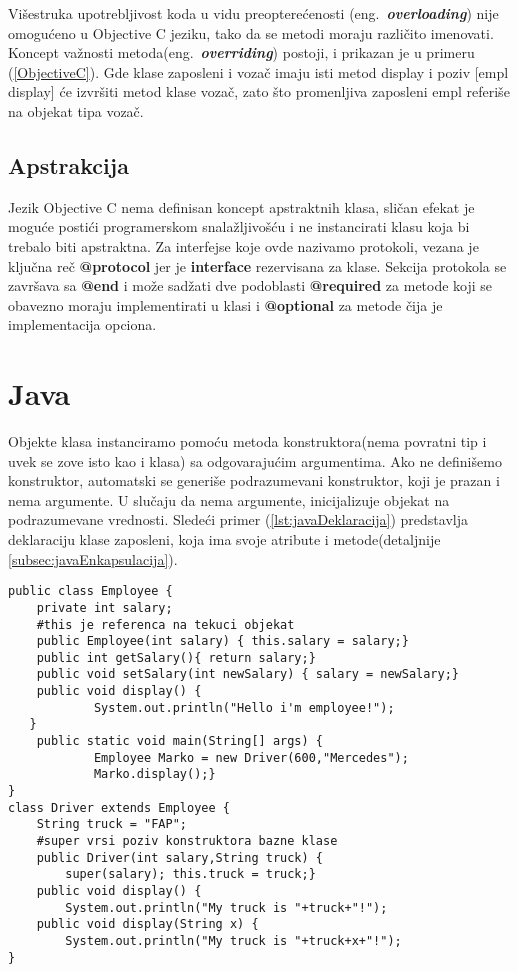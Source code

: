 \documentclass[a4paper]{article}
\begin{document}
Višestruka upotrebljivost koda u vidu preopterećenosti (eng.~\textbf{\em overloading}) nije omogućeno u Objective C jeziku, tako da se metodi moraju različito imenovati\cite{ObjectiveCbook}. Koncept važnosti metoda(eng.~\textbf{\em overriding})  postoji, i prikazan je u primeru (\ref{ObjectiveC}). Gde klase zaposleni i vozač imaju isti metod display i poziv [empl display] će izvršiti metod klase vozač, zato što promenljiva zaposleni empl referiše na objekat tipa vozač.

\subsection{Apstrakcija}
\label{subsec:ObjCApstrakcija}

Jezik Objective C nema definisan koncept apstraktnih klasa\cite{ObjectiveCbook}, sličan efekat je moguće postići programerskom snalažljivošću i ne instancirati klasu koja bi trebalo biti apstraktna. Za interfejse koje ovde nazivamo protokoli, vezana je ključna reč \textbf{@protocol} jer je \textbf{interface} rezervisana za klase. Sekcija protokola se završava sa \textbf{@end} i može sadžati dve podoblasti \textbf{@required} za metode koji se obavezno moraju implementirati u klasi i \textbf{@optional} za metode čija je implementacija opciona.

\section{Java}
\label{sec:java}

Objekte klasa instanciramo pomoću metoda konstruktora(nema povratni tip i uvek se zove isto kao i klasa) sa odgovarajućim argumentima. Ako ne definišemo konstruktor, automatski se generiše podrazumevani konstruktor, koji je prazan i nema argumente. U slučaju da nema argumente, inicijalizuje objekat na podrazumevane vrednosti. Sledeći primer (\ref{lst:javaDeklaracija}) predstavlja deklaraciju klase zaposleni, koja ima svoje atribute i metode(detaljnije \ref{subsec:javaEnkapsulacija}).

\begin{lstlisting}[caption={Primer deklarisanja klase sa enkapsulacijom i nasleđivanjem},frame=single, label=lst:javaDeklaracija]
public class Employee {
	private int salary;
	#this je referenca na tekuci objekat
	public Employee(int salary) { this.salary = salary;}
 	public int getSalary(){ return salary;}
	public void setSalary(int newSalary) { salary = newSalary;}
	public void display() {
     		System.out.println("Hello i'm employee!");
   }
	public static void main(String[] args) {
    		Employee Marko = new Driver(600,"Mercedes");
    		Marko.display();}    
}
class Driver extends Employee {
  	String truck = "FAP";
	#super vrsi poziv konstruktora bazne klase
   	public Driver(int salary,String truck) {
		super(salary); this.truck = truck;}
  	public void display() {
		System.out.println("My truck is "+truck+"!");
	public void display(String x) {
		System.out.println("My truck is "+truck+x+"!");
}
\end{lstlisting}
\end{document}
